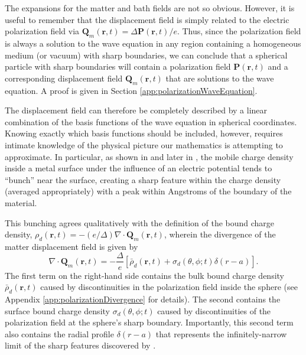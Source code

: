 \documentclass{article}
\begin{document}

The expansions for the matter and bath fields are not so obvious. However, it is useful to remember that the displacement field is simply related to the electric polarization field via $\mathbf{Q}_m(\mathbf{r},t) = \Delta\mathbf{P}(\mathbf{r},t)/e$. Thus, since the polarization field is always a solution to the wave equation in any region containing a homogeneous medium (or vacuum) with sharp boundaries, we can conclude that a spherical particle with sharp boundaries will contain a polarization field $\mathbf{P}(\mathbf{r},t)$ and a corresponding displacement field $\mathbf{Q}_m(\mathbf{r},t)$ that are solutions to the wave equation. A proof is given in Section \ref{app:polarizationWaveEquation}.

The displacement field can therefore be completely described by a linear combination of the basis functions of the wave equation in spherical coordinates. Knowing exactly which basis functions should be included, however, requires intimate knowledge of the physical picture our mathematics is attempting to approximate. In particular, as shown in \citet{liebsch1987dynamical} and later in \citet{ishida2002static}, the mobile charge density inside a metal surface under the influence of an electric potential tends to ``bunch'' near the surface, creating a sharp feature within the charge density (averaged appropriately) with a peak within Angstroms of the boundary of the material. 

This bunching agrees qualitatively with the definition of the bound charge density, $\rho_d(\mathbf{r},t) = -(e/\Delta)\nabla\cdot\mathbf{Q}_m(\mathbf{r},t)$, wherein the divergence of the matter displacement field is given by
\begin{equation}
\nabla\cdot\mathbf{Q}_m(\mathbf{r},t) = -\frac{\Delta}{e}\left[\bar{\rho}_d(\mathbf{r},t) + \sigma_d(\theta,\phi;t)\delta(r - a)\right].
\end{equation}
The first term on the right-hand side contains the bulk bound charge density $\bar{\rho}_d(\mathbf{r},t)$ caused by discontinuities in the polarization field inside the sphere (see Appendix \ref{app:polarizationDivergence} for details). The second contains the surface bound charge density $\sigma_d(\theta,\phi;t)$ caused by discontinuities of the polarization field at the sphere's sharp boundary. Importantly, this second term also contains the radial profile $\delta(r - a)$ that represents the infinitely-narrow limit of the sharp features discovered by \citet{ishida2002static}. 
\end{document}
